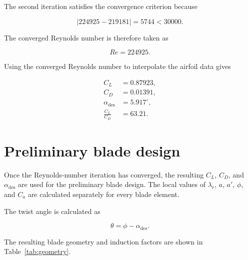 \documentclass[11pt,a4paper]{article}
\begin{document}
The second iteration satisfies the convergence criterion because

\[
|224925-219181|
=
5744
<
30000.
\]

The converged Reynolds number is therefore taken as

\[
\boxed{Re=224925}.
\]

Using the converged Reynolds number to interpolate the airfoil data gives

\begin{align}
C_L &= 0.87923,\\
C_D &= 0.01391,\\
\alpha_{\mathrm{des}} &= 5.917^\circ,\\
\frac{C_L}{C_D} &= 63.21.
\end{align}

\section{Preliminary blade design}

Once the Reynolds-number iteration has converged, the resulting
$C_L$, $C_D$, and $\alpha_{\mathrm{des}}$ are used for the preliminary blade
design. The local values of $\lambda_r$, $a$, $a'$, $\phi$, and $C_a$ are
calculated separately for every blade element.

The twist angle is calculated as

\begin{equation}
    \theta=\phi-\alpha_{\mathrm{des}}.
\end{equation}

The resulting blade geometry and induction factors are shown in
Table~\ref{tab:geometry}.
\end{document}
